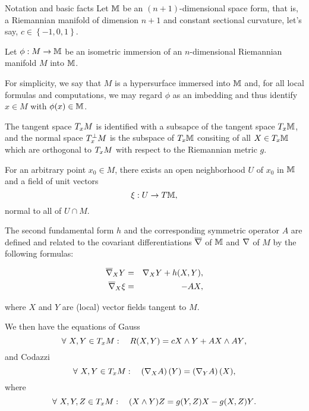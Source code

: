 \begin{frame}[allowframebreaks]{Notation and basic facts}
	Let \(\ambientspace\) be an \((n+1)\)-dimensional space form, that is, a
	Riemannian manifold of dimension \(n+1\) and constant sectional curvature,
	let's say, \(c\in\left\{-1,0,1\right\}\).

	\framebreak

	Let \(\phi:M\to\ambientspace\) be an isometric immersion of an
	\(n\)-dimensional Riemannian manifold \(M\) into \(\ambientspace\).

	\framebreak

	For simplicity, we say that \(M\) is a hypersurface immersed into
	\(\ambientspace\) and, for all local formulas and computations, we may regard
	\(\phi\) as an imbedding and thus identify \(x\in{M}\) with
	\(\phi(x)\in\ambientspace\).

	\framebreak

	The tangent space \(\tangentspace{M}{x}\) is identified with a subsapce of
	the tangent space \(\tangentspace{\ambientspace}{x}\), and the normal space
	\(\normalspace{M}{x}\) is the subspace of \(\tangentspace{\ambientspace}{x}\)
	consiting of all \(X\in\tangentspace{\ambientspace}{x}\) which are orthogonal
	to \(\tangentspace{M}{x}\) with respect to the Riemannian metric \(g\).

	\framebreak

	For an arbitrary point \(x_{0}\in{M}\), there exists an open neighborhood
	\(U\) of \(x_{0}\) in \(\ambientspace\) and a field of unit vectors
	\[
		\xi:U\to{T\ambientspace},
	\]
	normal to all of \(U\cap{M}\).

	\framebreak

	The second fundamental form \(h\) and the corresponding symmetric operator
	\(A\) are defined and related to the covariant differentiations
	\(\ambientconn\) of \(\ambientspace\) and \(\immersionconn\) of
	\(M\) by the following formulas:

	\begin{eqnarray}
		\ambientconn_{X}Y   & = & \immersionconn_{X}Y+h(X,Y),\label{eq:second-fundamental-form}\\
		\ambientconn_{X}\xi & = & -AX,\label{eq:shape-operator}
	\end{eqnarray}

	where \(X\) and \(Y\) are (local) vector fields tangent to \(M\).

	\framebreak

	We then have the equations of Gauss
	\begin{equation}\label{eq:gauss}
		\forevery{X,Y}\in\tangentspace{M}{x}:\quad{R(X,Y)=cX\wedge{Y}+AX\wedge{AY}},
	\end{equation}
	and Codazzi
	\begin{equation}\label{eq:codazzi}
		\forevery{X,Y}\in\tangentspace{M}{x}:
		\quad{\tensorcovariantderivative{A}{\immersionconn}{X}{(Y)}=\tensorcovariantderivative{A}{\immersionconn}{Y}{(X)}},
	\end{equation}
	where
	\[
		\forevery{X,Y,Z}\in\tangentspace{M}{x}:\quad{(X\wedge{Y})Z=g(Y,Z)X-g(X,Z)Y}.
	\]


\end{frame}
